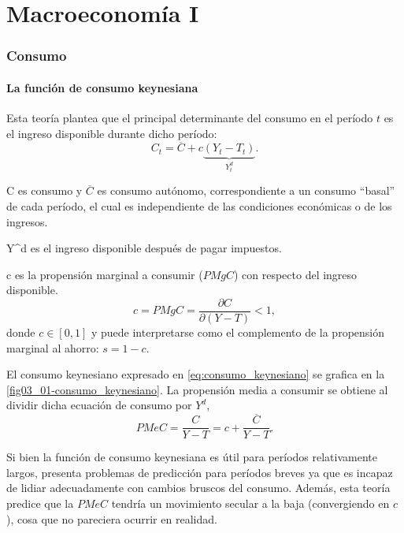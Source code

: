 \documentclass[DeGregorioResumen]{subfiles}
\begin{document}
\part*{Macroeconomía I}
\section{Consumo}
\subsection{La función de consumo keynesiana}
Esta teoría plantea que el principal determinante del consumo en el período $t$ es el ingreso disponible durante dicho período:
\begin{equation}
C_t=\overline{C}+c\underbrace{(Y_t-T_t)}_{Y^d_t}.
\label{eq:consumo_keynesiano}
\end{equation}
\begin{where}
\item[C] es consumo y $\overline{C}$ es consumo autónomo, correspondiente a un consumo ``basal'' de cada período, el cual es independiente de las condiciones económicas o de los ingresos.
\item[Y^d] es el ingreso disponible después de pagar impuestos.
\item[c] es la propensión marginal a consumir ($PMgC $) con respecto del ingreso disponible.
\begin{equation*}
c=PMgC=\frac{\partial C}{ \partial (Y-T)} < 1,
\end{equation*}
donde $c \in [0,1]$ y puede interpretarse como el complemento de la propensión marginal al ahorro: $s=1-c$.
\end{where}

El consumo keynesiano expresado en \eqref{eq:consumo_keynesiano} se grafica en la \autoref{fig03_01-consumo_keynesiano}. La propensión media a consumir se obtiene al dividir dicha ecuación de consumo por $Y^d$,
\begin{equation*}
PMeC=\frac{C}{Y-T}=c+\frac{\overline{C}}{Y-T}.
\end{equation*}



Si bien la función de consumo keynesiana es útil para períodos relativamente largos, presenta problemas de predicción para períodos breves ya que es incapaz de lidiar adecuadamente con cambios bruscos del consumo. Además, esta teoría predice que la $PMeC$ tendría un movimiento secular a la baja (convergiendo en $c$), cosa que no pareciera ocurrir en realidad.
\end{document}
